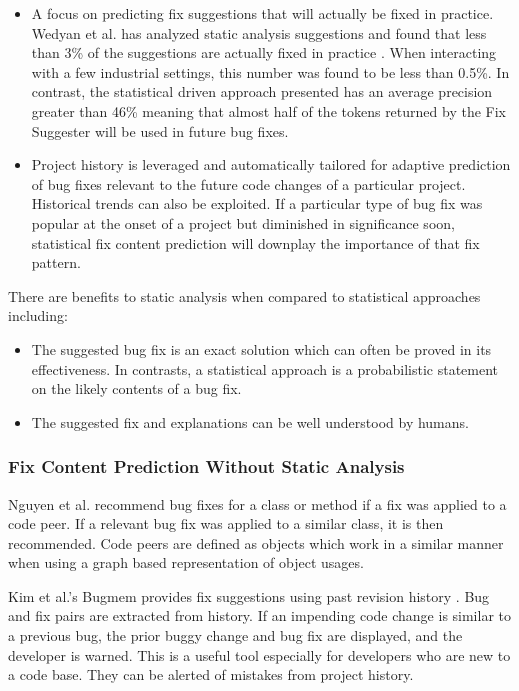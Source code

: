 \documentclass[preprint,10pt]{sigplanconf}
\begin{document}
\begin{itemize}
\item A focus on predicting fix suggestions that will actually be fixed in practice. Wedyan et al.
has analyzed static analysis suggestions and found that less than
3\% of the suggestions are actually fixed in practice \cite{wedyan2009effectiveness}. When interacting
with a few industrial settings, this number was found to be less than
0.5\%. In contrast, the statistical driven approach presented has an average precision greater than 46\% meaning that almost half of the tokens returned by the Fix Suggester will be used in future bug fixes.  
\item Project history is leveraged and automatically tailored for adaptive
prediction of bug fixes relevant to the future code changes of a particular
project. Historical trends can also be exploited. If a particular
type of bug fix was popular at the onset of a project but diminished
in significance soon, statistical fix content prediction will downplay
the importance of that fix pattern.
\end{itemize}

There are benefits to static analysis when compared to statistical
approaches including:

\begin{itemize}

\item The suggested bug fix is an exact solution which can often be proved
in its effectiveness. In contrasts, a statistical approach is a probabilistic
statement on the likely contents of a bug fix.

\item The suggested fix and explanations can be well understood by humans.

\end{itemize}

\subsubsection{Fix Content Prediction Without Static Analysis}
Nguyen et al. \cite{nguyen2010recurring} recommend bug fixes for a class or method if a fix was applied to a code peer. If a relevant bug fix was applied to a similar class, it is then recommended. Code peers are defined as objects which work in a similar manner when using a graph based representation of object usages.

Kim et al.'s Bugmem provides fix suggestions using past revision history \cite{Kim2006} . Bug and fix pairs are extracted from history. If an impending code change is similar to a previous bug, the prior buggy change and bug fix are displayed, and the developer is warned. This is a useful tool especially for developers who are new to a code base. They can be alerted of mistakes from project history. 
\end{document}
